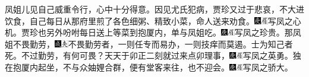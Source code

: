 凤姐儿见自己威重令行，心中十分得意。因见尤氏犯病，贾珍又过于悲哀，不大进饮食，自己每日从那府里煎了各色细粥、精致小菜，命人送来劝食。{\includegraphics[width=3mm]{../Images/00004}\includegraphics[width=3mm]{../Images/00010}\footnotesize \kaishu 写凤之心机。}贾珍也另外吩咐每日送上等菜到抱厦内，单与凤姐吃。{\includegraphics[width=3mm]{../Images/00004}\includegraphics[width=3mm]{../Images/00010}\footnotesize \kaishu 写凤之珍贵。}那凤姐不畏勤劳，{\includegraphics[width=3mm]{../Images/00005}\includegraphics[width=3mm]{../Images/00012}\footnotesize \kaishu 不畏勤劳者，一则任专而易办，一则技痒而莫遏。士为知己者死。不过勤劳，有何可畏？}天天于卯正二刻就过来点卯理事，{\includegraphics[width=3mm]{../Images/00004}\includegraphics[width=3mm]{../Images/00010}\footnotesize \kaishu 写凤之英勇。}独在抱厦内起坐，不与众妯娌合群，便有堂客来往，也不迎会。{\includegraphics[width=3mm]{../Images/00004}\includegraphics[width=3mm]{../Images/00010}\footnotesize \kaishu 写凤之骄大。}

